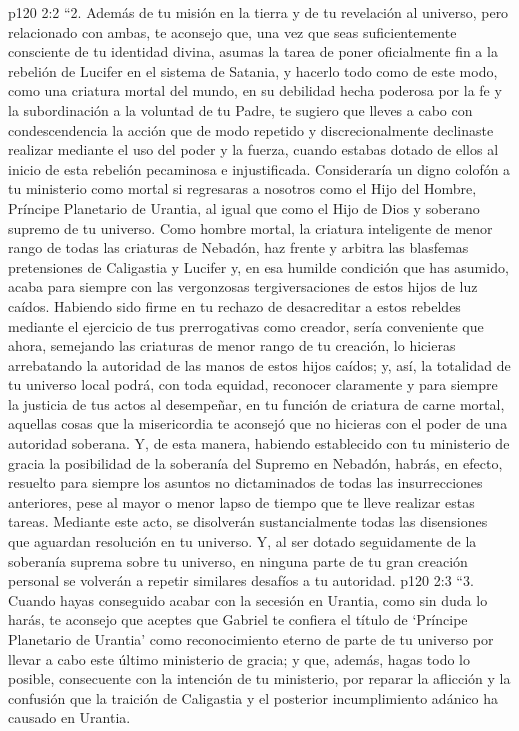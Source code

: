 \vs p120 2:2 \pc “2. Además de tu misión en la tierra y de tu revelación al universo, pero relacionado con ambas, te aconsejo que, una vez que seas suficientemente consciente de tu identidad divina, asumas la tarea de poner oficialmente fin a la rebelión de Lucifer en el sistema de Satania, y hacerlo todo como  de este modo, como una criatura mortal del mundo, en su debilidad hecha poderosa por la fe y la subordinación a la voluntad de tu Padre, te sugiero que lleves a cabo con condescendencia la acción que de modo repetido y discrecionalmente declinaste realizar mediante el uso del poder y la fuerza, cuando estabas dotado de ellos al inicio de esta rebelión pecaminosa e injustificada. Consideraría un digno colofón a tu ministerio como mortal si regresaras a nosotros como el Hijo del Hombre, Príncipe Planetario de Urantia, al igual que como el Hijo de Dios y soberano supremo de tu universo. Como hombre mortal, la criatura inteligente de menor rango de todas las criaturas de Nebadón, haz frente y arbitra las blasfemas pretensiones de Caligastia y Lucifer y, en esa humilde condición que has asumido, acaba para siempre con las vergonzosas tergiversaciones de estos hijos de luz caídos. Habiendo sido firme en tu rechazo de desacreditar a estos rebeldes mediante el ejercicio de tus prerrogativas como creador, sería conveniente que ahora, semejando las criaturas de menor rango de tu creación, lo hicieras arrebatando la autoridad de las manos de estos hijos caídos; y, así, la totalidad de tu universo local podrá, con toda equidad, reconocer claramente y para siempre la justicia de tus actos al desempeñar, en tu función de criatura de carne mortal, aquellas cosas que la misericordia te aconsejó que no hicieras con el poder de una autoridad soberana. Y, de esta manera, habiendo establecido con tu ministerio de gracia la posibilidad de la soberanía del Supremo en Nebadón, habrás, en efecto, resuelto para siempre los asuntos no dictaminados de todas las insurrecciones anteriores, pese al mayor o menor lapso de tiempo que te lleve realizar estas tareas. Mediante este acto, se disolverán sustancialmente todas las disensiones que aguardan resolución en tu universo. Y, al ser dotado seguidamente de la soberanía suprema sobre tu universo, en ninguna parte de tu gran creación personal se volverán a repetir similares desafíos a tu autoridad.
\vs p120 2:3 \pc “3. Cuando hayas conseguido acabar con la secesión en Urantia, como sin duda lo harás, te aconsejo que aceptes que Gabriel te confiera el título de ‘Príncipe Planetario de Urantia’ como reconocimiento eterno de parte de tu universo por llevar a cabo este último ministerio de gracia; y que, además, hagas todo lo posible, consecuente con la intención de tu ministerio, por reparar la aflicción y la confusión que la traición de Caligastia y el posterior incumplimiento adánico ha causado en Urantia.
